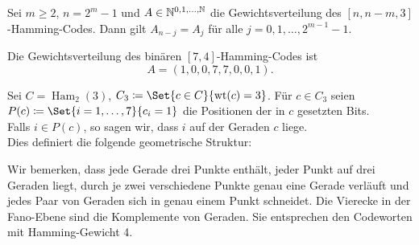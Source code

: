 \documentclass{cheat-sheet}
\newcommand{\F}{\mathbb{F}} %
\DeclareMathOperator{\wt}{wt} %
\DeclareMathOperator{\Ham}{Ham} %
\begin{document}

\begin{prop}
  Sei $m \geq 2$, $n = 2^m - 1$ und $A \in \mathbb{N}^{0, 1, \ldots, \mathbb{N}}$ die Gewichtsverteilung des $[n, n - m, 3]$-Hamming-Codes.
  Dann gilt $A_{n-j} = A_j$ für alle $j = 0, 1, \ldots, 2^{m-1} - 1$.
\end{prop}

\begin{satz}
  Die Gewichtsverteilung des binären $[7,4]$-Hamming-Codes ist
  \[ A = (1, 0, 0, 7, 7, 0, 0, 1). \]
\end{satz}

\begin{bem}
  Sei $C = \Ham_2(3)$, $C_3 \coloneqq \Set{c \in C}{\wt(c) = 3}$.
  Für $c \in C_3$ seien $P(c) \coloneqq \Set{i = 1, \ldots, 7}{c_i = 1}$ die Positionen der in $c$ gesetzten Bits. \\
  Falls $i \in P(c)$, so sagen wir, dass $i$ auf der Geraden $c$ liege. \\
  Dies definiert die folgende geometrische Struktur:
\begin{center}
\end{center}
  Wir bemerken, dass jede Gerade drei Punkte enthält, jeder Punkt auf drei Geraden liegt, durch je zwei verschiedene Punkte genau eine Gerade verläuft und jedes Paar von Geraden sich in genau einem Punkt schneidet.
  Die Vierecke in der Fano-Ebene sind die Komplemente von Geraden.
  Sie entsprechen den Codeworten mit Hamming-Gewicht 4.
\end{bem}

\end{document}
